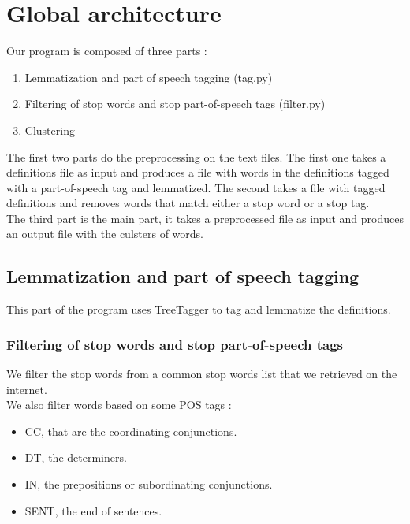 \documentclass{eplDoc}
\begin{document}
\maketitle
\newpage

\section{Global architecture}

Our program is composed of three parts : 
\begin{enumerate}
	\item Lemmatization and part of speech tagging (tag.py)
	\item Filtering of stop words and stop part-of-speech tags (filter.py)
	\item Clustering  %
\end{enumerate}

The first two parts do the preprocessing on the text files. The first one takes a definitions file as input and produces a file with words in the definitions tagged with a part-of-speech tag and lemmatized. The second takes a file with tagged definitions and removes words that match either a stop word or a stop tag. \\ 

The third part is the main part, it takes a preprocessed file as input and produces an output file with the culsters of words. 

\subsection{Lemmatization and part of speech tagging}
This part of the program uses TreeTagger to tag and lemmatize the definitions.

\subsubsection{Filtering of stop words and stop part-of-speech tags}

We filter the stop words from a common stop words list that we retrieved on the internet. \\ 
We also filter words based on some POS tags : 
\begin{itemize}
	\item CC, that are the coordinating conjunctions.
	\item DT, the determiners.
	\item IN, the prepositions or subordinating conjunctions.
	\item SENT, the end of sentences.
\end{itemize}
\end{document}

